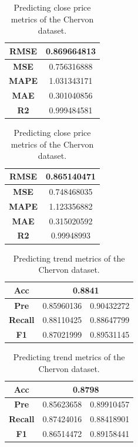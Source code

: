 \begin{table}[H]
	\centering
	\begin{minipage}{0.45\textwidth}
		\centering
		\begin{tabular}{|c|c|}
			\hline
			\textbf{RMSE} & 0.869664813 \\
			\hline
			\textbf{MSE}  & 0.756316888 \\
			\hline
			\textbf{MAPE} & 1.031343171 \\
			\hline
			\textbf{MAE}  & 0.301040856 \\
			\hline
			\textbf{R2}   & 0.999484581 \\
			\hline
		\end{tabular}
	\end{minipage}
	\begin{minipage}{0.45\textwidth}
		\centering
		\begin{tabular}{|c|c|}
			\hline
			\textbf{RMSE} & 0.865140471 \\
			\hline
			\textbf{MSE}  & 0.748468035 \\
			\hline
			\textbf{MAPE} & 1.123356882 \\
			\hline
			\textbf{MAE}  & 0.315020592 \\
			\hline
			\textbf{R2}   & 0.99948993  \\
			\hline
		\end{tabular}
	\end{minipage}
	\caption{Predicting close price metrics of the Chervon dataset.}
	\label{metric:che_close}
\end{table}
\begin{table}[H]
	\centering
	\begin{minipage}{0.45\textwidth}
		\centering
		\begin{tabular}{|c|c|c|}
			\hline
			\textbf{Acc}    & \multicolumn{2}{c|}{0.8841} \\
			\hline
			\textbf{Pre}    & 0.85960136                 & 0.90432272 \\
			\hline
			\textbf{Recall} & 0.88110425                 & 0.88647799 \\
			\hline
			\textbf{F1}     & 0.87021999                 & 0.89531145 \\
			\hline
		\end{tabular}
	\end{minipage}
	\begin{minipage}{0.45\textwidth}
		\centering
		\begin{tabular}{|c|c|c|}
			\hline
			\textbf{Acc}    & \multicolumn{2}{c|}{0.8798} \\
			\hline
			\textbf{Pre}    & 0.85623658                 & 0.89910457 \\
			\hline
			\textbf{Recall} & 0.87424016                 & 0.88418901 \\
			\hline
			\textbf{F1}     & 0.86514472                 & 0.89158441 \\
			\hline
		\end{tabular}
	\end{minipage}
	\caption{Predicting trend metrics of the Chervon dataset.}
	\label{metric:che_trend}
\end{table}
